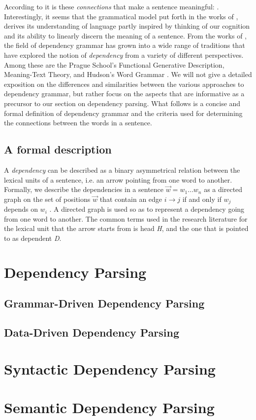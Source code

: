 According to \citeauthor{Tes:15} it is these \textit{connections} that make a sentence meaningful:  \cite{Tes:15}. Interestingly, it seems that the grammatical model put forth in the works of \citeauthor{Tes:15}, derives its understanding of language partly inspired by thinking of our cognition and its ability to linearly discern the meaning of a sentence. From the works of \citeauthor{Tes:15}, the field of dependency grammar has grown into a wide range of traditions that have explored the notion of \textit{dependency} from a variety of different perspectives. Among these are the Prague School's Functional Generative Description, Meaning-Text Theory, and Hudson's Word Grammar \cite{Sgall:86, Mel:88, Hudson:90}. We will not give a detailed exposition on the differences and similarities between the various approaches to dependency grammar, but rather focus on the aspects that are informative as a precursor to our section on dependency parsing. What follows is a concise and formal definition of dependency grammar and the criteria used for determining the connections between the words in a sentence.

\subsection{A formal description}
A \textit{dependency} can be described as a binary asymmetrical relation between the lexical units of a sentence, i.e. an arrow pointing from one word to another. Formally, we describe the dependencies in a sentence $\vec{w} = w_1 ... w_n$ as a directed graph on the set of positions $\vec{w}$ that contain an edge $i \rightarrow j$ if and only if $w_j$ depends on $w_i$ \cite{Kuhl:10}. A directed graph is used so as to represent a dependency going from one word to another. The common terms used in the research literature for the lexical unit that the arrow starts from is head \textit{H}, and the one that is pointed to as dependent \textit{D}.



\section{Dependency Parsing}
\subsection{Grammar-Driven Dependency Parsing}
\subsection{Data-Driven Dependency Parsing}


\section{Syntactic Dependency Parsing}


\section{Semantic Dependency Parsing}